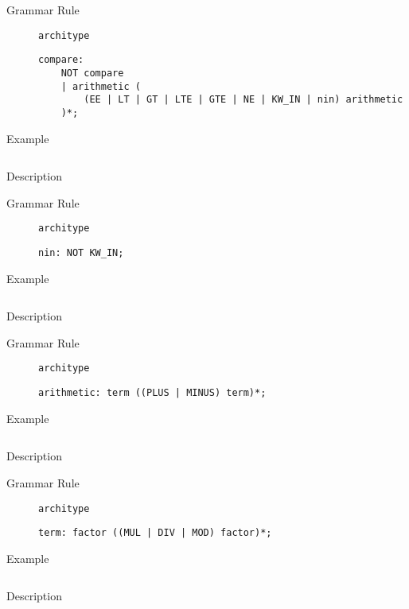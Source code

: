 \begin{description}
    \item[Grammar Rule] \texttt{architype}
          \begin{lstlisting}[style=gram]
compare:
	NOT compare
	| arithmetic (
		(EE | LT | GT | LTE | GTE | NE | KW_IN | nin) arithmetic
	)*;
\end{lstlisting}
    \item[Example] \texttt{}
          \begin{lstlisting}
    \end{lstlisting}

    \item[Description]
\end{description}


\begin{description}
    \item[Grammar Rule] \texttt{architype}
          \begin{lstlisting}[style=gram]
nin: NOT KW_IN;
\end{lstlisting}
    \item[Example] \texttt{}
          \begin{lstlisting}
    \end{lstlisting}

    \item[Description]
\end{description}


\begin{description}
    \item[Grammar Rule] \texttt{architype}
          \begin{lstlisting}[style=gram]
arithmetic: term ((PLUS | MINUS) term)*;
\end{lstlisting}
    \item[Example] \texttt{}
          \begin{lstlisting}
    \end{lstlisting}

    \item[Description]
\end{description}


\begin{description}
    \item[Grammar Rule] \texttt{architype}
          \begin{lstlisting}[style=gram]
term: factor ((MUL | DIV | MOD) factor)*;
\end{lstlisting}
    \item[Example] \texttt{}
          \begin{lstlisting}
    \end{lstlisting}

    \item[Description]
\end{description}


